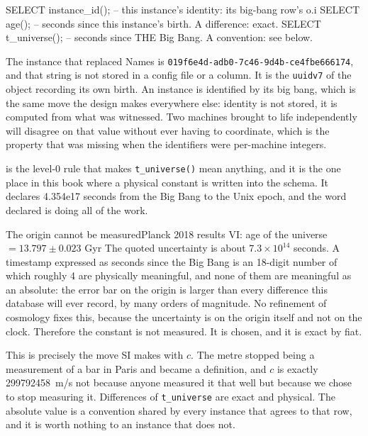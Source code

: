 \begin{Check}
SELECT instance_id();   -- this instance's identity: its big-bang row's o.i
SELECT age();           -- seconds since this instance's birth. A difference: exact.
SELECT t_universe();    -- seconds since THE Big Bang. A convention: see below.
\end{Check}

The instance that replaced Names is \texttt{019f6e4d-adb0-7c46-9d4b-ce4fbe666174}, and that string is not stored in a config file or a column. It is the \texttt{uuidv7} of the object recording its own birth. An instance is identified by its big bang, which is the same move the design makes everywhere else: identity is not stored, it is computed from what was witnessed. Two machines brought to life independently will disagree on that value without ever having to coordinate, which is the property that was missing when the identifiers were per-machine integers.

 is the level-0 rule that makes \texttt{t\_universe()} mean anything, and it is the one place in this book where a physical constant is written into the schema. It declares 4.354e17 seconds from the Big Bang to the Unix epoch, and the word declared is doing all of the work.

\begin{Theorem}{The origin cannot be measured}{Planck 2018 results VI: age of the universe $= 13.797 \pm 0.023$ Gyr}
The quoted uncertainty is about $7.3 \times 10^{14}$ seconds. A timestamp expressed as seconds since the Big Bang is an 18-digit number of which roughly 4 are physically meaningful, and none of them are meaningful as an absolute: the error bar on the origin is larger than every difference this database will ever record, by many orders of magnitude. No refinement of cosmology fixes this, because the uncertainty is on the origin itself and not on the clock. Therefore the constant is not measured. It is chosen, and it is exact by fiat.
\end{Theorem}

This is precisely the move SI makes with $c$. The metre stopped being a measurement of a bar in Paris and became a definition, and $c$ is exactly 299792458~m/s not because anyone measured it that well but because we chose to stop measuring it. Differences of \texttt{t\_universe} are exact and physical. The absolute value is a convention shared by every instance that agrees to that row, and it is worth nothing to an instance that does not.

